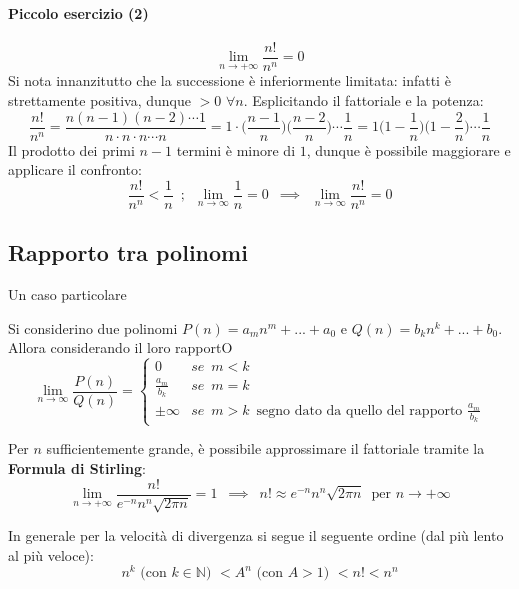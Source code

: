 \documentclass[10pt]{article}
\theoremstyle{plain}
\begin{document}
\paragraph*{Piccolo esercizio (2)}
\[\lim \limits_{n \rightarrow + \infty} \frac{n!}{n^n} = 0\]
Si nota innanzitutto che la successione è inferiormente limitata: infatti è strettamente positiva, dunque $> 0$ $\forall n$. Esplicitando il fattoriale e la potenza:
\[\frac{n!}{n^n} = \frac{n (n-1) (n-2) \cdots 1}{n \cdot n \cdot n \cdots n} = 1 \cdot \bigg(\frac{n-1}{n}\bigg) \bigg(\frac{n-2}{n}\bigg) \cdots \frac{1}{n} = 1 \bigg(1 - \frac{1}{n}\bigg) \bigg(1 - \frac{2}{n}\bigg) \cdots \frac{1}{n}\]
Il prodotto dei primi $n-1$ termini è minore di $1$, dunque è possibile maggiorare e applicare il confronto:
\[\frac{n!}{n^n} < \frac{1}{n} \enspace ; \enspace \lim \limits_{n \rightarrow \infty} \frac{1}{n} = 0 \enspace \implies \enspace \lim \limits_{n \rightarrow \infty} \frac{n!}{n^n} = 0\]

\subsection{Rapporto tra polinomi}
Un caso particolare
\begin{prop}
    Si considerino due polinomi $P(n) = a_m n^m + ... + a_0$ e $Q(n) = b_k n^k + ... + b_0$. Allora considerando il loro rapportO
    \[\lim \limits_{n \rightarrow \infty} \frac{P(n)}{Q(n)} = \begin{cases}
        0 & se \enspace m < k\\
        \frac{a_m}{b_k} & se \enspace m = k\\
        \pm \infty & se \enspace m > k \enspace \textrm{segno dato da quello del rapporto } \frac{a_m}{b_k}
    \end{cases}\]
\end{prop}

\begin{oss}
    Per $n$ sufficientemente grande, è possibile approssimare il fattoriale tramite la \textbf{Formula di Stirling}:
    \[\lim \limits_{n \rightarrow +\infty} \frac{n!}{e^{-n} n^n \sqrt{2 \pi n}} = 1 \enspace \implies \enspace n! \approx e^{-n} n^n \sqrt{2 \pi n} \enspace \textrm{per } n \rightarrow +\infty\]
\end{oss}
\begin{oss}
    In generale per la velocità di divergenza si segue il seguente ordine (dal più lento al più veloce):
    \[n^k \textrm{ (con $k \in \mathbb{N}$) } < A^n \textrm{ (con $A > 1$) } < n! < n^n\]
\end{oss}
\end{document}
